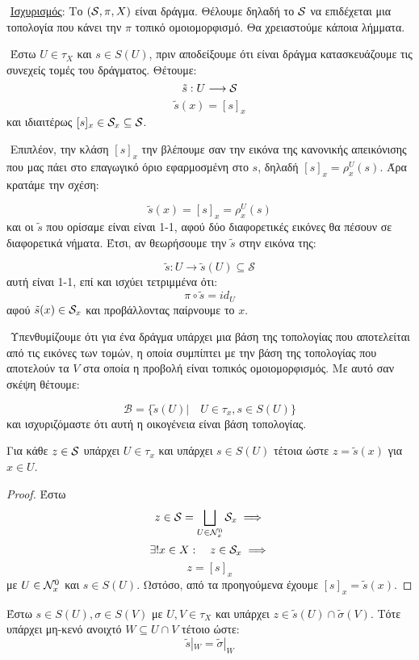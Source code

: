 $ $\newline
\underline{Ισχυρισμός}: Το $(\mathcal{S}, \pi, X)$ είναι δράγμα. Θέλουμε δηλαδή το $\mathcal{S}$ να επιδέχεται μια τοπολογία που κάνει την $\pi$ τοπικό ομοιομορφισμό. Θα χρειαστούμε κάποια λήμματα.

$ $\newline
Έστω $U\in\tau_X$ και $s\in S(U)$, πριν αποδείξουμε ότι είναι δράγμα κατασκευάζουμε τις συνεχείς τομές του δράγματος. Θέτουμε:
$$\tilde{s} : U \longrightarrow \mathcal{S}$$
$$\tilde{s}(x) = [s]_x$$ και ιδιαιτέρως $[s]_x \in \mathcal{S}_x \subseteq \mathcal{S}$.

$ $\newline
Επιπλέον, την κλάση $[s]_x$ την βλέπουμε σαν την εικόνα της κανονικής απεικόνισης που μας πάει στο επαγωγικό όριο εφαρμοσμένη στο $s$, δηλαδή $[s]_x = \rho^U_x (s)$. Άρα κρατάμε την σχέση: 


$$\tilde{s}(x) = [s]_x = \rho^U_x(s)$$ και οι $\tilde{s}$ που ορίσαμε είναι είναι 1-1, αφού δύο διαφορετικές εικόνες θα πέσουν σε διαφορετικά νήματα. Έτσι, αν θεωρήσουμε την $\tilde{s}$ στην εικόνα της:

$$\tilde{s} : U \rightarrow \tilde{s}(U)\subseteq \mathcal{S}$$ αυτή είναι 1-1, επί και ισχύει τετριμμένα ότι: 
$$\pi \circ \tilde{s} = id_U$$ αφού $\tilde{s}(x) \in \mathcal{S}_x$ και προβάλλοντας παίρνουμε το $x$.


$ $\newline
Υπενθυμίζουμε ότι για ένα δράγμα υπάρχει μια βάση της τοπολογίας που αποτελείται από τις εικόνες των τομών, η οποία συμπίπτει με την βάση της τοπολογίας που αποτελούν τα $V$ στα οποία η προβολή είναι τοπικός ομοιομορφισμός. Με αυτό σαν σκέψη θέτουμε:


$$\mathcal{B} = \{\tilde{s}(U)| \quad U \in \tau_x, s \in S(U)\}$$
και ισχυριζόμαστε ότι αυτή η οικογένεια είναι βάση τοπολογίας.

\begin{lemma}[1] Για κάθε $z \in \mathcal{S}$ υπάρχει $U\in \tau_x$ και υπάρχει $s \in S(U)$ τέτοια ώστε $z = \tilde{s}(x)$ για $x \in U$.
\end{lemma}

\begin{proof}
     Έστω 
     $$z \in \mathcal{S} = \bigsqcup\limits_{U \in \mathcal{N}^0_x} \mathcal{S}_x \implies$$
     $$\exists ! x \in X: \quad z \in \mathcal{S}_x \implies$$
     $$z = [s]_x$$ με $U \in \mathcal{N}^0_x$ και $s \in S(U)$. Ωστόσο, από τα προηγούμενα έχουμε $[s]_x = \tilde{s} (x)$.
\end{proof}
\vspace*{0.2cm}
\begin{lemma}[2]
    Έστω $s \in S(U), \sigma \in S(V)$ με $U,V \in \tau_X$ και υπάρχει $z \in \tilde{s}(U)\cap \tilde{\sigma}(V)$. Τότε υπάρχει μη-κενό ανοιχτό $W \subseteq U\cap V$ τέτοιο ώστε:
    $$\tilde{s}|_W = \tilde{\sigma}|_W$$ 
\end{lemma}

